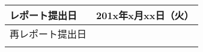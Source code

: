 \begin{titlepage}
    \vspace{4mm}

    \begin{table}[H]
      \centering
      \large
      \begin{tabularx}{\textwidth}{|M{36mm}|R|}
        \hline
        レポート提出日   & 201x年x月xx日（火）\rule[-3mm]{0mm}{9mm}\\ \hline
        再レポート提出日 &\rule[-3mm]{0mm}{9mm}\\ \hline
                         &\rule[-3mm]{0mm}{9mm}\\
        \hline
      \end{tabularx}
    \end{table}

\end{titlepage}
